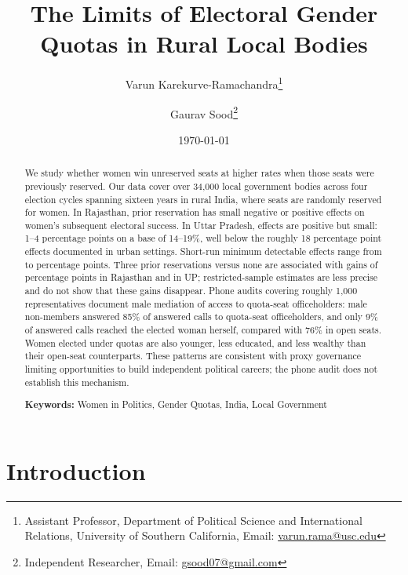 \documentclass[12pt]{article}
\title{The Limits of Electoral Gender Quotas in Rural Local Bodies}
\author{Varun Karekurve-Ramachandra\thanks{Assistant Professor, Department of Political Science and International Relations, University of Southern California, Email: \href{mailto:varun.rama@usc.edu}{varun.rama@usc.edu}} \and Gaurav Sood\thanks{Independent Researcher, Email: \href{mailto:gsood07@gmail.com}{gsood07@gmail.com}}}
\date{\today}
\begin{document}
\maketitle



\begin{abstract}
\noindent We study whether women win unreserved seats at higher rates when those seats were previously reserved. Our data cover over 34,000 local government bodies across four election cycles spanning sixteen years in rural India, where seats are randomly reserved for women. In Rajasthan, prior reservation has small negative or positive effects on women's subsequent electoral success. In Uttar Pradesh, effects are positive but small: 1–4 percentage points on a base of 14–19\%, well below the roughly 18 percentage point effects documented in urban settings. Short-run minimum detectable effects range from \shortMdeMin{} to \shortMdeMax{} percentage points. Three prior reservations versus none are associated with gains of \rajFullAlways{} percentage points in Rajasthan and \upFullAlways{} in UP; restricted-sample estimates are less precise and do not show that these gains disappear. Phone audits covering roughly 1,000 representatives document male mediation of access to quota-seat officeholders: male non-members answered 85\% of answered calls to quota-seat officeholders, and only 9\% of answered calls reached the elected woman herself, compared with 76\% in open seats. Women elected under quotas are also younger, less educated, and less wealthy than their open-seat counterparts. These patterns are consistent with proxy governance limiting opportunities to build independent political careers; the phone audit does not establish this mechanism.


\vspace{6mm}

\noindent \textbf{Keywords:} Women in Politics, Gender Quotas, India, Local Government

\end{abstract}

\thispagestyle{empty}

\newpage
\FloatBarrier

\doublespacing

\section{Introduction}
\end{document}
